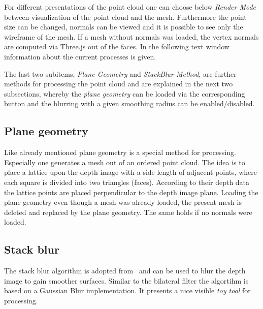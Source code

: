 \documentclass[paper=a4,11pt,bibliography=totoc]{scrartcl}
\begin{document}
For different presentations of the point cloud one can choose below \textit{Render Mode} between visualization of the point cloud and the mesh. Furthermore the point size can be changed, normals can be viewed and it is possible to see only the wireframe of the mesh. If a mesh without normals was loaded, the vertex normals are computed via Three.js out of the faces. In the following text window information about the current processes is given.

The last two subitems, \textit{Plane Geometry} and \textit{StackBlur Method}, are further methods for processing the point cloud and are explained in the next two subsections, whereby the \textit{plane geometry} can be loaded via the corresponding button and the blurring with a given smoothing radius can be enabled/disabled.
%
\subsection{Plane geometry}
\label{sec:planegeometry}
Like already mentioned plane geometry is a special method for processing. Especially one generates a mesh out of an ordered point cloud. The idea is to place a lattice upon the depth image with a side length of adjacent points, where each square is divided into two triangles (faces). According to their depth data the lattice points are placed perpendicular to the depth image plane. Loading the plane geometry even though a mesh was already loaded, the present mesh is deleted and replaced by the plane geometry. The same holds if no normals were loaded.
%
\subsection{Stack blur}
%
The stack blur algorithm is adopted from~\cite{stack} and can be used to blur the depth image to gain smoother surfaces. Similar to the bilateral filter the algortihm is based on a Gaussian Blur implementation. It presents a nice visible \textit{toy tool} for processing.
%
\end{document}
